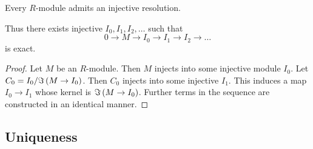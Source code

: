 \begin{proposition}
Every $ R $-module admits an injective resolution.
\end{proposition}

Thus there exists injective $ I_0, I_1, I_2, \dots $ such that
$$ 0 \to M \to I_0 \to I_1 \to I_2 \to \dots $$
is exact.

\begin{proof}
Let $ M $ be an $ R $-module. Then $ M $ injects into some injective module $ I_0 $. Let $ C_0 = I_0 / \Im \br{M \to I_0} $. Then $ C_0 $ injects into some injective $ I_1 $. This induces a map $ I_0 \to I_1 $ whose kernel is $ \Im \br{M \to I_0} $. Further terms in the sequence are constructed in an identical manner.
\end{proof}

\subsection{Uniqueness}

